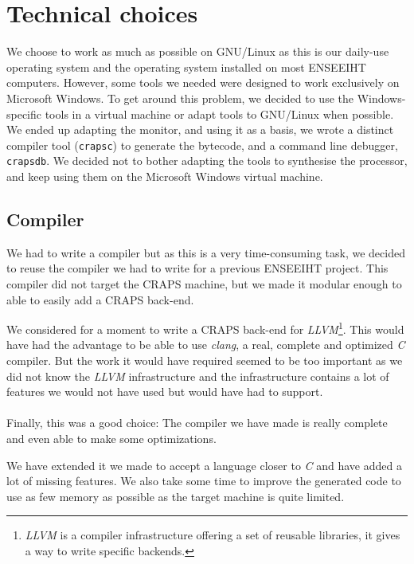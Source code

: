 \documentclass[openany, a4paper]{book}
\begin{document}
    \section{Technical choices}
      We choose to work as much as possible on GNU/Linux as this is our
      daily-use operating system and the operating system installed on most
      ENSEEIHT computers.
      However, some tools we needed were designed to work exclusively on
      Microsoft Windows. To get around this problem, we decided to use the
      Windows-specific tools in a virtual machine or adapt tools to GNU/Linux
      when possible. We ended up adapting the monitor, and using it as a basis,
      we wrote a distinct compiler tool (\verb+crapsc+) to generate the
      bytecode, and a command line debugger, \verb+crapsdb+. We decided not to
      bother adapting the tools to synthesise the processor, and keep using them
      on the Microsoft Windows virtual machine.

      \subsection{Compiler}
        We had to write a compiler but as this is a very time-consuming task, we
        decided to reuse the compiler we had to write for a previous ENSEEIHT
        project. This compiler did not target the CRAPS machine, but we made it
        modular enough to able to easily add a CRAPS back-end.

        We considered for a moment to write a CRAPS back-end for
        \emph{LLVM}\footnote{\emph{LLVM} is a compiler infrastructure
        offering a set of reusable libraries, it gives a way to write specific
        backends.\cite{llvm}}. This would have had the advantage to be able to
        use \emph{clang}, a real, complete and optimized \emph{C} compiler. But
        the work it would have required seemed to be too important as we did
        not know the \emph{LLVM} infrastructure and the infrastructure contains
        a lot of features we would not have used but would have had to
        support.

        \paragraph{}
        Finally, this was a good choice: The compiler we have made is really
        complete and even able to make some optimizations.

        We have extended it we made to accept a language closer to \emph{C} and
        have added a lot of missing features. We also take some time to improve
        the generated code to use as few memory as possible as the target
        machine is quite limited.
\end{document}

